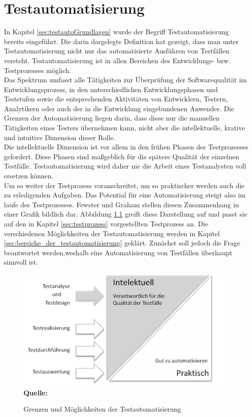 \chapter{Testautomatisierung}
\label{sec:testautomatisierung}
In Kapitel \ref{sec:testautoGrundlagen} wurde der Begriff Testautomatisierung bereits eingeführt. Die darin dargelegte Definition hat gezeigt, dass man unter Testautomatisierung nicht nur das automatisierte Ausführen von Testfällen versteht.
Testautomatisierung ist in allen Bereichen des Entwicklungs- bzw. Testprozesses möglich.\\
\glqq Das Spektrum umfasst alle Tätigkeiten zur Überprüfung der Softwarequalität im Entwicklungsprozess, in den unterschiedlichen Entwicklungsphasen und Teststufen sowie die entsprechenden Aktivitäten von Entwicklern, Testern, Analytikern oder auch der in die Entwicklung eingebundenen Anwender. Die Grenzen der Automatisierung liegen darin, dass diese nur die manuellen Tätigkeiten eines Testers übernehmen kann, nicht aber die intellektuelle, krative und intuitive Dimension dieser Rolle.\grqq\ \cite[S.7]{seidl_basiswissen_2012} \\
Die intellektuelle Dimension ist vor allem in den frühen Phasen des Testprozesses gefordert. Diese Phasen sind maßgeblich für die spätere Qualität der einzelnen Testfälle. Testautomatisierung wird daher nie die Arbeit eines Testanalysten voll ersetzen können.\\
Um so weiter der Testprozess voranschreitet, um so praktischer werden auch die zu erledigenden Aufgaben. Das Potential für eine Automatisierung steigt also im laufe des Testprozesses.
Fewster und Graham \cite[vgl. S.18]{fewster_software_1999} stellen diesen Zusammenhang in einer Grafik bildlich dar.  Abbildung \ref{fig:intellektuellVsPraktisch} greift diese Darstellung auf und passt sie auf den in Kapitel \ref{sec:testprozess} vorgestellten Testprozess an. Die verschiedenen Möglichkeiten der Testautomatisierung werden in Kapitel \ref{sec:bereiche_der_testautomatisierung} geklärt. Zunächst soll jedoch die Frage beantwortet werden,weshalb eine Automatisierung von Testfällen überhaupt sinnvoll ist.

\begin{figure}[htb]
  \centering  
  \includegraphics[scale=1]{img/intelektuellVsPraktisch.png}\\
  \footnotesize\sffamily\textbf{Quelle:} \cite[vgl. S.18]{fewster_software_1999}
  \caption{Grenzen und Möglichkeiten der Testautomatisierung}
  \label{fig:intellektuellVsPraktisch}
\end{figure}

